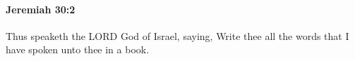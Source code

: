 
		\paragraph{Jeremiah 30:2} %
			\label{JEREMIAH-30-2}

			Thus speaketh the LORD God of Israel, saying, Write thee all the words that I have spoken unto thee in a book.



